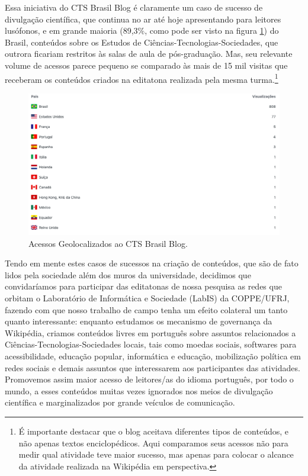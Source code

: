 Essa iniciativa do CTS Brasil Blog é claramente um caso de sucesso de divulgação científica, que continua no ar até hoje apresentando para leitores lusófonos, e em grande maioria (89,3\%, como pode ser visto na figura \ref{fig:acessos-geo-cts-brasil}) do Brasil, conteúdos sobre os Estudos de Ciências-Tecnologias-Sociedades, que outrora ficariam restritos às salas de aula de pós-graduação. Mas, seu relevante volume de acessos parece pequeno se comparado às mais de 15 mil visitas que receberam os conteúdos criados na editatona realizada pela mesma turma.\footnote{É importante destacar que o blog aceitava diferentes tipos de conteúdos, e não apenas textos enciclopédicos. Aqui comparamos seus acessos não para medir qual atividade teve maior sucesso, mas apenas para colocar o alcance da atividade realizada na Wikipédia em perspectiva.}

\begin{figure}[H]
    \centering
    \includegraphics[width=1\textwidth]{Images/acessos-geo-cts-brasil.png}
    \caption{Acessos Geolocalizados ao CTS Brasil Blog.}
    \label{fig:acessos-geo-cts-brasil}
\end{figure}

Tendo em mente estes casos de sucessos na criação de conteúdos, que são de fato lidos pela sociedade além dos muros da universidade, decidimos que convidaríamos para participar das editatonas de nossa pesquisa as redes que orbitam o Laboratório de Informática e Sociedade (LabIS) da COPPE/UFRJ, fazendo com que nosso trabalho de campo tenha um efeito colateral um tanto quanto interessante: enquanto estudamos os mecanismo de governança da Wikipédia, criamos conteúdos livres em português sobre assuntos relacionados a Ciências-Tecnologias-Sociedades locais, tais como moedas sociais, softwares para acessibilidade, educação popular, informática e educação, mobilização política em redes sociais e demais assuntos que interessarem aos participantes das atividades. Promovemos assim maior acesso de leitores/as do idioma português, por todo o mundo, a esses conteúdos muitas vezes ignorados nos meios de divulgação científica e marginalizados por grande veículos de comunicação.

